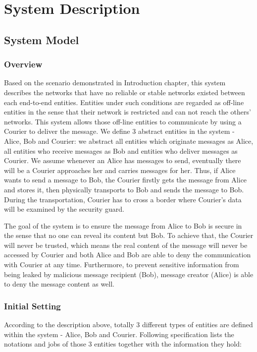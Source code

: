 \chapter{System Description}
\section{System Model}
\subsection{Overview}
Based on the scenario demonstrated in Introduction chapter, this system describes the networks that have no reliable or stable networks existed between each end-to-end entities. Entities under such conditions are regarded as off-line entities in the sense that their network is restricted and can not reach the others' networks. This system allows those off-line entities to communicate by using a Courier to deliver the message. We define 3 abstract entities in the system - Alice, Bob and Courier: we abstract all entities which originate messages as Alice, all entities who receive messages as Bob and entities who deliver messages as Courier. We assume whenever an Alice has messages to send, eventually there will be a Courier approaches her and carries messages for her. Thus, if Alice wants to send a message to Bob, the Courier firstly gets the message from Alice and stores it, then physically transports to Bob and sends the message to Bob. During the transportation, Courier has to cross a border where Courier's data will be examined by the security guard.

The goal of the system is to ensure the message from Alice to Bob is secure in the sense that no one can reveal its content but Bob. To achieve that, the Courier will never be trusted, which means the real content of the message will never be accessed by Courier and both Alice and Bob are able to deny the communication with Courier at any time. Furthermore, to prevent sensitive information from being leaked by malicious message recipient (Bob), message creator (Alice) is able to deny the message content as well.

\subsection{Initial Setting}
According to the description above, totally 3 different types of entities are defined within the system - Alice, Bob and Courier. Following specification lists the notations and jobs of those 3 entities together with the information they hold:

